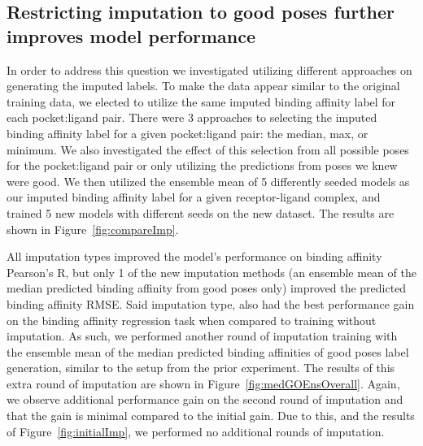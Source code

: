 \documentclass[journal=jmcmar,manuscript=article]{achemso}
\begin{document}
\subsection{Restricting imputation to good poses further improves model performance}
In order to address this question we investigated utilizing different approaches on generating the imputed labels.
To make the data appear similar to the original training data, we elected to utilize the same imputed binding affinity label for each pocket:ligand pair.
There were 3 approaches to selecting the imputed binding affinity label for a given pocket:ligand pair: the median, max, or minimum.
We also investigated the effect of this selection from all possible poses for the pocket:ligand pair or only utilizing the predictions from poses we knew were good.
We then utilized the ensemble mean of 5 differently seeded models as our imputed binding affinity label for a given receptor-ligand complex, and trained 5 new models with different seeds on the new dataset.
The results are shown in Figure~\ref{fig:compareImp}.

All imputation types improved the model's performance on binding affinity Pearson's R, but only 1 of the new imputation methods (an ensemble mean of the median predicted binding affinity from good poses only) improved the predicted binding affinity RMSE.
Said imputation type, also had the best performance gain on the binding affinity regression task when compared to training without imputation.
As such, we performed another round of imputation training with the ensemble mean of the median predicted binding affinities of good poses label generation, similar to the setup from the prior experiment.
The results of this extra round of imputation are shown in Figure~\ref{fig:medGOEnsOverall}.
Again, we observe additional performance gain on the second round of imputation and that the gain is minimal compared to the initial gain.
Due to this, and the results of Figure~\ref{fig:initialImp}, we performed no additional rounds of imputation.
\end{document}

